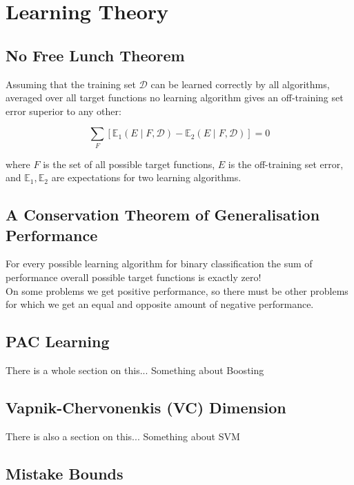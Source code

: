 \section{Learning Theory}

\subsection{No Free Lunch Theorem}

Assuming that the training set \(\mathcal{D}\) can be learned correctly by all algorithms, averaged over all target functions no learning algorithm gives an off-training set error superior to any other:

\[\sum_F [\mathbb{E}_1 (E \mid F, \mathcal{D}) - \mathbb{E}_2(E \mid F, \mathcal{D})] = 0\]

where \(F\) is the set of all possible target functions, \(E\) is the off-training set error, and \(\mathbb{E}_1, \mathbb{E}_2\) are expectations for two learning algorithms.

\subsection{A Conservation Theorem of Generalisation Performance}

For every possible learning algorithm for binary classification the sum of performance overall possible target functions is exactly zero! \\

On some problems we get positive performance, so there must be other problems for which we get an equal and opposite amount of negative performance.

\subsection{PAC Learning}

There is a whole section on this... Something about Boosting

\subsection{Vapnik-Chervonenkis (VC) Dimension}

There is also a section on this... Something about SVM

\subsection{Mistake Bounds}

